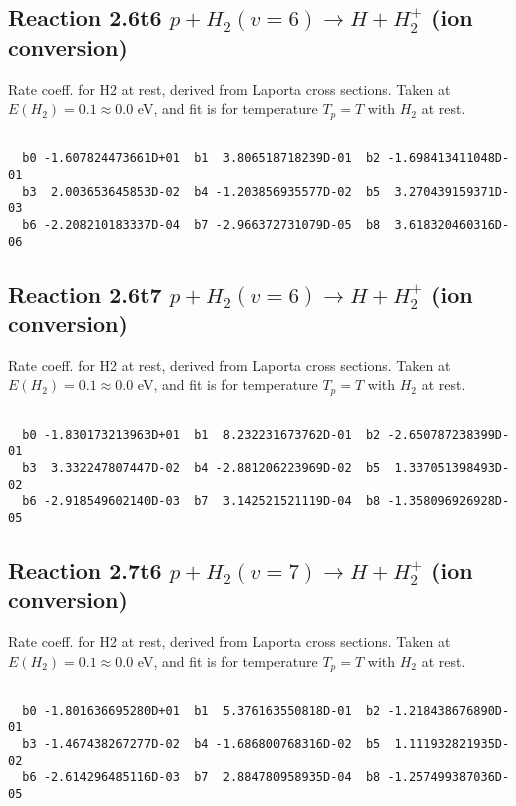 \documentclass[12pt,dvipdfmx]{article}
\begin{document}
\newpage
\subsection{
Reaction 2.6t6
$ p + H_2(v=6) \rightarrow H + H_2^+$ (ion conversion)
}
Rate coeff. for H2 at rest, derived from Laporta cross sections.
Taken at $E(H_2) = 0.1 \approx 0.0$ eV,  and fit is for temperature $T_p=T$ with $H_2$ at rest.

\begin{small}\begin{verbatim}

  b0 -1.607824473661D+01  b1  3.806518718239D-01  b2 -1.698413411048D-01
  b3  2.003653645853D-02  b4 -1.203856935577D-02  b5  3.270439159371D-03
  b6 -2.208210183337D-04  b7 -2.966372731079D-05  b8  3.618320460316D-06

\end{verbatim}\end{small}

\newpage
\subsection{
Reaction 2.6t7
$ p + H_2(v=6) \rightarrow H + H_2^+$ (ion conversion)
}
Rate coeff. for H2 at rest, derived from Laporta cross sections.
Taken at $E(H_2) = 0.1 \approx 0.0$ eV,  and fit is for temperature $T_p=T$ with $H_2$ at rest.

\begin{small}\begin{verbatim}

  b0 -1.830173213963D+01  b1  8.232231673762D-01  b2 -2.650787238399D-01
  b3  3.332247807447D-02  b4 -2.881206223969D-02  b5  1.337051398493D-02
  b6 -2.918549602140D-03  b7  3.142521521119D-04  b8 -1.358096926928D-05

\end{verbatim}\end{small}

\newpage
\subsection{
Reaction 2.7t6
$ p + H_2(v=7) \rightarrow H + H_2^+$ (ion conversion)
}
Rate coeff. for H2 at rest, derived from Laporta cross sections.
Taken at $E(H_2) = 0.1 \approx 0.0$ eV,  and fit is for temperature $T_p=T$ with $H_2$ at rest.

\begin{small}\begin{verbatim}

  b0 -1.801636695280D+01  b1  5.376163550818D-01  b2 -1.218438676890D-01
  b3 -1.467438267277D-02  b4 -1.686800768316D-02  b5  1.111932821935D-02
  b6 -2.614296485116D-03  b7  2.884780958935D-04  b8 -1.257499387036D-05

\end{verbatim}\end{small}
\end{document}
